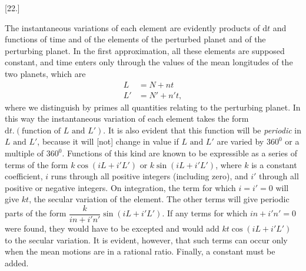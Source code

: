 \par{}\bigskip
{}
\begin{center}[22.]\end{center}
\begingroup
\setlength{\lineskip}{4pt}\setlength{\lineskiplimit}{4pt}
\noindent\hspace*{\parindent}The instantaneous variations of each element are evidently products of \(\mathrm{d}t\) and functions of time and of the elements of the perturbed planet and of the perturbing planet. In the first approximation, all these elements are supposed constant, and time enters only through the values of the mean longitudes of the two planets, which are
\[
\begin{aligned}
L&=N+nt\\
L'&=N'+n't,
\end{aligned}
\]
where we distinguish by primes all quantities relating to the perturbing planet. In this way the instantaneous variation of each element takes the form \(\mathrm{d}t.(\text{function of }L\text{ and }L')\). It is also evident that this function will be \textit{periodic} in \(L\text{ and }L'\), because it will [not] change in value if \(L\text{ and }L'\) are varied by \(360^{0}\) or a multiple of \(360^{0}\). Functions of this kind are known to be expressible as a series of terms of the form \(k\cos(iL+i'L')\) or \(k\sin(iL+i'L')\), where \(k\) is a constant coefficient, \(i\) runs through all positive integers (including zero), and \(i'\) through all positive or negative integers. On integration, the term for which \(i=i'=0\) will give \(kt\), the secular variation of the element. The other terms will give periodic parts of the form \(\dfrac{k}{in+i'n'}\sin(iL+i'L')\). If any terms for which \(in+i'n'=0\) were found, they would have to be excepted and would add \(kt\cos(iL+i'L')\) to the secular variation. It is evident, however, that such terms can occur only when the mean motions are in a rational ratio. Finally, a constant must be added.
\par\endgroup
